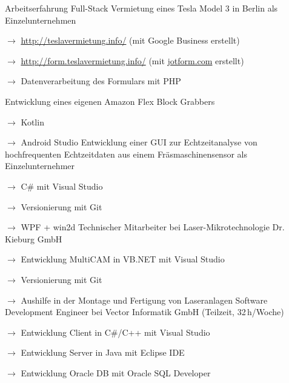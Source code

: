 \begin{rubric}{\textcolor{black!20!blue!100}{Arbeitserfahrung}}%
		\entry*[seit 10/2019]
			Full-Stack Vermietung eines Tesla Model 3 in Berlin als Einzelunternehmen
			
			\setlength{\hangindent}{\widthof{$\rightarrow$ }}
			$\rightarrow$ \url{http://teslavermietung.info/} (mit Google Business erstellt)

			$\rightarrow$ \url{http://form.teslavermietung.info/} (mit \href{https://www.jotform.com/}{jotform.com} erstellt)

			$\rightarrow$ Datenverarbeitung des Formulars mit PHP
			
		\entry*[2021 --- 2022]
			Entwicklung eines eigenen Amazon Flex Block Grabbers
			
			\setlength{\hangindent}{\widthof{$\rightarrow$ }}
			$\rightarrow$ Kotlin
			
			$\rightarrow$ Android Studio
		\entry*[03/2020 --- 05/2020]
			Entwicklung einer GUI zur Echtzeitanalyse von hochfrequenten Echtzeitdaten aus einem Fräsmaschinensensor als Einzelunternehmer
			
			\setlength{\hangindent}{\widthof{$\rightarrow$ }}
			$\rightarrow$ C\# mit Visual Studio
			
			$\rightarrow$ Versionierung mit Git
			
			$\rightarrow$ WPF + win2d
		\entry*[04/07/2019 --- 30/09/2020]
			Technischer Mitarbeiter bei \glqq Laser-Mikrotechnologie Dr. Kieburg GmbH\grqq
			
			\setlength{\hangindent}{\widthof{$\rightarrow$ }}
			$\rightarrow$ Entwicklung MultiCAM in VB.NET mit Visual Studio
			
			$\rightarrow$ Versionierung mit Git
			
			$\rightarrow$ Aushilfe in der Montage und Fertigung von Laseranlagen
		\entry*[11/2017 --- 03/2019]
			Software Development Engineer bei Vector Informatik GmbH (Teilzeit, 32\,h/Woche)
			
			\setlength{\hangindent}{\widthof{$\rightarrow$ }}
			$\rightarrow$ Entwicklung Client in C\#/C++ mit Visual Studio
			
			$\rightarrow$ Entwicklung Server in Java mit Eclipse IDE
			
			$\rightarrow$ Entwicklung Oracle DB mit Oracle SQL Developer
			

\end{rubric}
